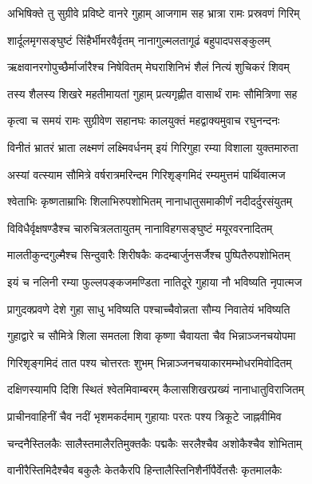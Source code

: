 
\twolineshloka
{अभिषिक्ते तु सुग्रीवे प्रविष्टे वानरे गुहाम्}
{आजगाम सह भ्रात्रा रामः प्रस्रवणं गिरिम्} %

\twolineshloka
{शार्दूलमृगसङ्घुष्टं सिंहैर्भीमरवैर्वृतम्}
{नानागुल्मलतागूढं बहुपादपसङ्कुलम्} %

\twolineshloka
{ऋक्षवानरगोपुच्छैर्मार्जारैश्च निषेवितम्}
{मेघराशिनिभं शैलं नित्यं शुचिकरं शिवम्} %

\twolineshloka
{तस्य शैलस्य शिखरे महतीमायतां गुहाम्}
{प्रत्यगृह्णीत वासार्थं रामः सौमित्रिणा सह} %

\twolineshloka
{कृत्वा च समयं रामः सुग्रीवेण सहानघः}
{कालयुक्तं महद्वाक्यमुवाच रघुनन्दनः} %

\twolineshloka
{विनीतं भ्रातरं भ्राता लक्ष्मणं लक्ष्मिवर्धनम्}
{इयं गिरिगुहा रम्या विशाला युक्तमारुता} %

\twolineshloka
{अस्यां वत्स्याम सौमित्रे वर्षरात्रमरिन्दम}
{गिरिशृङ्गमिदं रम्यमुत्तमं पार्थिवात्मज} %

\twolineshloka
{श्वेताभिः कृष्णताम्राभिः शिलाभिरुपशोभितम्}
{नानाधातुसमाकीर्णं नदीदर्दुरसंयुतम्} %

\twolineshloka
{विविधैर्वृक्षषण्डैश्च चारुचित्रलतायुतम्}
{नानाविहगसङ्घुष्टं मयूरवरनादितम्} %

\twolineshloka
{मालतीकुन्दगुल्मैश्च सिन्दुवारैः शिरीषकैः}
{कदम्बार्जुनसर्जैश्च पुष्पितैरुपशोभितम्} %

\twolineshloka
{इयं च नलिनी रम्या फुल्लपङ्कजमण्डिता}
{नातिदूरे गुहाया नौ भविष्यति नृपात्मज} %

\twolineshloka
{प्रागुदक्प्रवणे देशे गुहा साधु भविष्यति}
{पश्चाच्चैवोन्नता सौम्य निवातेयं भविष्यति} %

\twolineshloka
{गुहाद्वारे च सौमित्रे शिला समतला शिवा}
{कृष्णा चैवायता चैव भिन्नाञ्जनचयोपमा} %

\twolineshloka
{गिरिशृङ्गमिदं तात पश्य चोत्तरतः शुभम्}
{भिन्नाञ्जनचयाकारमम्भोधरमिवोदितम्} %

\twolineshloka
{दक्षिणस्यामपि दिशि स्थितं श्वेतमिवाम्बरम्}
{कैलासशिखरप्रख्यं नानाधातुविराजितम्} %

\twolineshloka
{प्राचीनवाहिनीं चैव नदीं भृशमकर्दमाम्}
{गुहायाः परतः पश्य त्रिकूटे जाह्नवीमिव} %

\twolineshloka
{चन्दनैस्तिलकैः सालैस्तमालैरतिमुक्तकैः}
{पद्मकैः सरलैश्चैव अशोकैश्चैव शोभिताम्} %

\twolineshloka
{वानीरैस्तिमिदैश्चैव बकुलैः केतकैरपि}
{हिन्तालैस्तिनिशैर्नीपैर्वेतसैः कृतमालकैः} %

